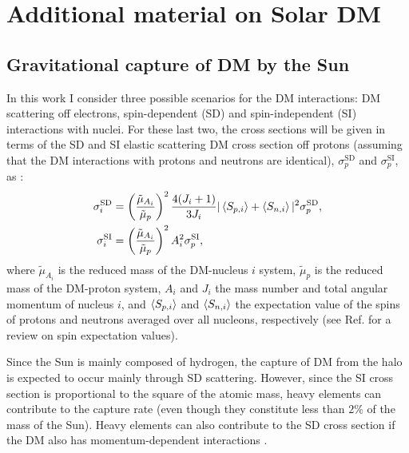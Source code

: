 \chapter{Additional material on Solar DM}

\section{Gravitational capture of DM by the Sun}
\label{sec:dm_analysis_capture_rates}

In this work I consider three possible scenarios for the DM interactions: DM scattering off electrons, spin-dependent (SD) and spin-independent (SI) interactions with nuclei. For these last two, the cross sections will be given in terms of the SD and SI elastic scattering DM cross section off protons (assuming that the DM interactions with protons and neutrons are identical), $\sigma_{p}^{\mathrm{SD}}$ and $\sigma_{p}^{\mathrm{SI}}$, as \cite{Bernal2012,Palomares2017}:
\begin{align}\label{2.3-2.4}
	\sigma_{i}^{\mathrm{SD}} &= \left(\frac{\tilde{\mu}_{A_{i}}}{\tilde{\mu}_{p}}\right)^{2} \frac{4(J_{i}+1)}{3 J_{i}} |\expval{S_{p,i}} + \expval{S_{n,i}}|^{2} \sigma_{p}^{\mathrm{SD}},\\
	\sigma_{i}^{\mathrm{SI}} &= \left(\frac{\tilde{\mu}_{A_{i}}}{\tilde{\mu}_{p}}\right)^{2} A_{i}^{2} \sigma_{p}^{\mathrm{SI}},
\end{align}
where $\tilde{\mu}_{A_{i}}$ is the reduced mass of the DM-nucleus $i$ system, $\tilde{\mu}_{p}$ is the reduced mass of the DM-proton system, $A_{i}$ and $J_{i}$ the mass number and total angular momentum of nucleus $i$, and $\expval{S_{p,i}}$ and $\expval{S_{n,i}}$ the expectation value of the spins of protons and neutrons averaged over all nucleons, respectively (see Ref. \cite{Bednyakov2004} for a review on spin expectation values).

Since the Sun is mainly composed of hydrogen, the capture of DM from the halo is expected to occur mainly through SD scattering. However, since the SI cross section is proportional to the square of the atomic mass, heavy elements can contribute to the capture rate (even though they constitute less than $2\%$ of the mass of the Sun). Heavy elements can also contribute to the SD cross section if the DM also has momentum-dependent interactions \cite{Catena2015}.

